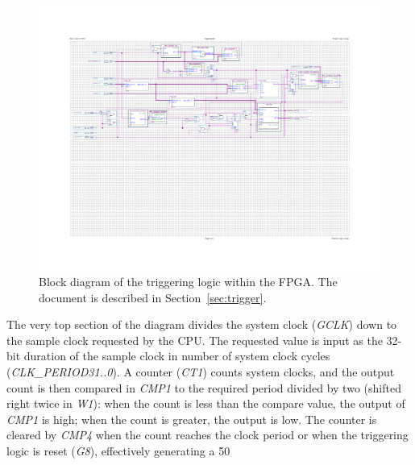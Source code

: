 \documentclass[titlepage]{scrartcl}
\begin{document}
	\begin{figure}[h!]
	\vspace{-4cm}
	\centerline{\includegraphics[width=30cm, angle=90, origin=c]{img/triggering.pdf}}
		\vspace{-2cm}
                	\caption{Block diagram of the triggering logic within the FPGA. The document is described in Section~\ref{sec:trigger}.}
               	\label{fig:triggering_bdf}
	\end{figure}

	The very top section of the diagram divides the system clock (\textit{GCLK}) down to the sample clock requested by the CPU. The requested value is input as the 32-bit duration of the sample clock in number of system clock cycles (\textit{CLK\_PERIOD31..0}). A counter (\textit{CT1}) counts system clocks, and the output count is then compared in \textit{CMP1} to the required period divided by two (shifted right twice in \textit{W1}): when the count is less than the compare value, the output of \textit{CMP1} is high; when the count is greater, the output is low. The counter is cleared by \textit{CMP4} when the count reaches the clock period or when the triggering logic is reset (\textit{G8}), effectively generating a 50%
\end{document}

